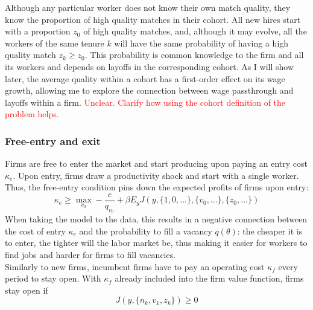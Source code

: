 Although any particular worker does not know their own match quality, they know the proportion of high quality matches in their cohort. All new hires start with a proportion $z_0$ of high quality matches, and, although it may evolve, all the workers of the same tenure $k$ will have the same probability of having a high quality match $z_k\geq z_0$. This probability is common knowledge to the firm and all its workers and depends on layoffs in the corresponding cohort. As I will show later, the average quality within a cohort has a first-order effect on its wage growth, allowing me to explore the connection between wage passthrough and layoffs within a firm. \textcolor{red}{Unclear. Clarify how using the cohort definition of the problem helps.}

\subsubsection*{Free-entry and exit}
Firms are free to enter the market and start producing upon paying an entry cost $\kappa_e$. Upon entry, firms draw a productivity shock and start with a single worker. Thus, the free-entry condition pins down the expected profits of firms upon entry:
\begin{equation} \label{freeentry}
    \kappa_e\geq \max_{v_0} -\frac{c}{q_{v_0}}+\beta E_y J(y,\{1,0,...\},\{v_0,...\},\{z_0,...\})
\end{equation}
When taking the model to the data, this results in a negative connection between the cost of entry $\kappa_e$ and the probability to fill a vacancy $q(\theta)$: the cheaper it is to enter, the tighter will the labor market be, thus making it easier for workers to find jobs and harder for firms to fill vacancies.
\\
Similarly to new firms, incumbent firms have to pay an operating cost $\kappa_f$ every period to stay open. With $\kappa_f$ already included into the firm value function, firms stay open if 
\begin{equation} \label{freeexit}
    J(y,\{n_k,v_k,z_k\})\geq 0
\end{equation}

